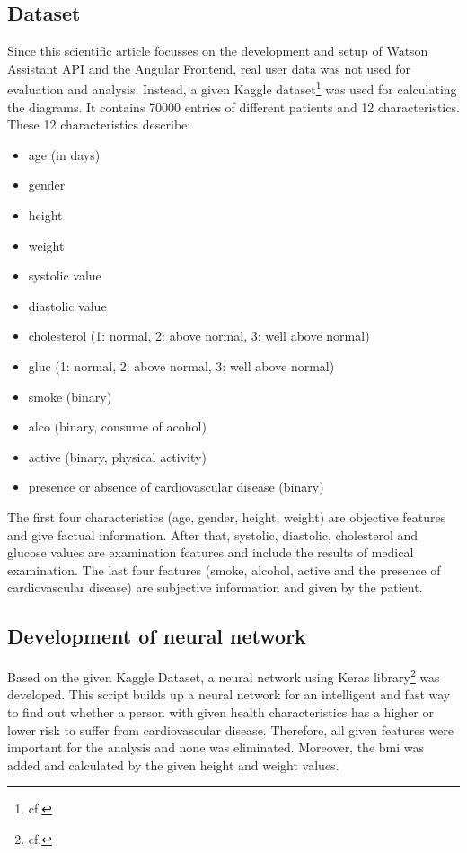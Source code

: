 \subsection{Dataset}
Since this scientific article focusses on the development and setup of Watson Assistant API and the Angular Frontend, real user data was not used for evaluation and analysis. Instead, a given Kaggle dataset\footnote{cf.\autocite{kaggle}} was used for calculating the diagrams. It contains 70000 entries of different patients and 12 characteristics. These 12 characteristics describe:
\begin{itemize}
\setlength\itemsep{-0.5em}
  \item age (in days)
  \item gender
  \item height
  \item weight
  \item systolic value
  \item diastolic value
  \item cholesterol (1: normal, 2: above normal, 3: well above normal)
  \item gluc (1: normal, 2: above normal, 3: well above normal)
  \item smoke (binary)
  \item alco (binary, consume of acohol)
  \item active (binary, physical activity)
  \item presence or absence of cardiovascular disease (binary) 
\end{itemize}  

The first four characteristics (age, gender, height, weight) are objective features and give factual information. After that, systolic, diastolic, cholesterol and glucose values are examination features and include the results of medical examination. The last four features (smoke, alcohol, active and the presence of cardiovascular disease) are subjective information and given by the patient.

\subsection{Development of neural network} \label{python}
Based on the given Kaggle Dataset, a neural network using Keras library\footnote{cf.\autocite{keras}} was developed. This script builds up a neural network for an intelligent and fast way to find out whether a person with given health characteristics has a higher or lower risk to suffer from cardiovascular disease. Therefore, all given features were important for the analysis and none was eliminated. Moreover, the \ac{bmi} was added and calculated by the given height and weight values. 

